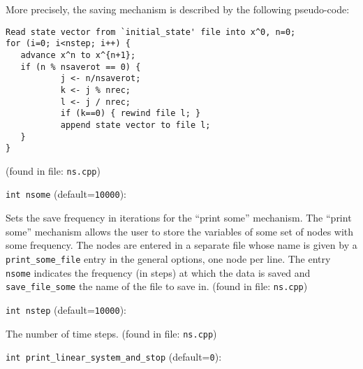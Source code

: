 More precisely, the saving mechanism is described by the following
pseudo-code:

\begin{verbatim}
Read state vector from `initial_state' file into x^0, n=0;
for (i=0; i<nstep; i++) {
   advance x^n to x^{n+1};
   if (n % nsaverot == 0) {
           j <- n/nsaverot;
           k <- j % nrec;
           l <- j / nrec;
           if (k==0) { rewind file l; }
           append state vector to file l;
   }
}
\end{verbatim}
 (found in file: \verb+ns.cpp+)
\item\verb+int nsome+ {\rm(default=\verb|10000|)}:

Sets the save frequency in iterations for the ``print some''
mechanism. 
\label{sec:print_some}
The ``print some'' mechanism allows the user to store the variables of
some set of nodes with some frequency. The nodes are entered in a
separate file whose name is given by a \verb+print_some_file+ entry in
the general options, one node per line. The entry \verb+nsome+
indicates the frequency (in steps) at which the data is saved and
\verb+save_file_some+ the name of the file to save in. 
 (found in file: \verb+ns.cpp+)
\item\verb+int nstep+ {\rm(default=\verb|10000|)}:

The number of time steps. 
 (found in file: \verb+ns.cpp+)
\item\verb+int print_linear_system_and_stop+ {\rm(default=\verb|0|)}:

